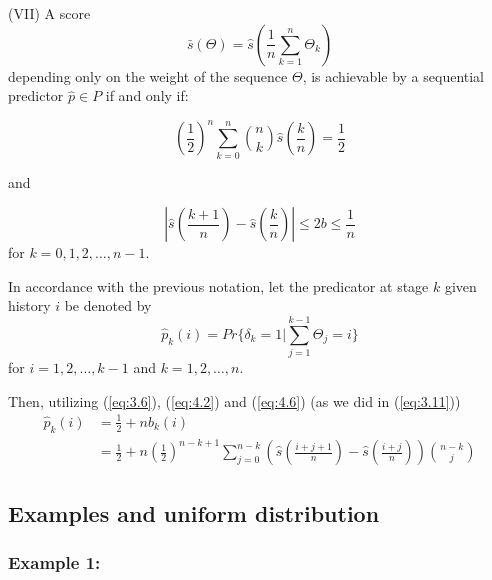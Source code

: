 \documentclass[11pt]{article}
\numberwithin{equation}{section}
\theoremstyle{boldStyle}
\begin{document}
\bigbreak

\begin{boxA}
    (VII) A score 
    \begin{equation} \label{eq:4.7}
        \bar{s}(\Theta) = \hat{s}\left(\frac{1}{n} \sum_{k=1}^n \Theta_k \right)
    \end{equation}
    depending only on the weight of the sequence $\Theta$, is achievable by a sequential predictor $\hat{p} \in P$ if and only if:

    \begin{equation} \label{eq:4.8}
        \left(\frac{1}{2}\right)^n \sum_{k=0}^n \binom{n}{k} \hat{s} \left(\frac{k}{n}\right) = \frac{1}{2}
    \end{equation}

    and

    \begin{equation} \label{eq:4.9}
        \left| \hat{s} \left(\frac{k+1}{n}\right) - \hat{s} \left(\frac{k}{n}\right) \right| \leq 2b \leq \frac{1}{n}
    \end{equation}
    for $k = 0, 1, 2, \ldots, n-1$.
\end{boxA}

\bigbreak

In accordance with the previous notation, let the predicator at stage $k$ given history $i$ be denoted by 
\begin{equation} \label{eq:4.10}
    \hat{p}_k(i) = Pr \{ \delta_k = 1 | \sum_{j=1}^{k-1} \Theta_j = i \}
\end{equation}
for $i = 1, 2, \ldots, k-1$ and $k = 1, 2, \ldots, n$.

Then, utilizing (\ref{eq:3.6}), (\ref{eq:4.2}) and (\ref{eq:4.6}) (as we did in (\ref{eq:3.11}))
\begin{equation} \label{eq:4.11}
    \begin{aligned}
        \hat{p}_k(i) &= \frac{1}{2} + n b_k(i) \\
        &= \frac{1}{2} + n \left(\frac{1}{2}\right)^{n-k+1} 
            \sum_{j=0}^{n-k} \left(\hat{s} \left( \frac{i+j+1}{n} \right) - \hat{s} \left( \frac{i+j}{n} \right) \right) \binom{n-k}{j}
    \end{aligned}
\end{equation}

\subsection{Examples and uniform distribution}

\subsubsection{Example 1:}
\end{document}
